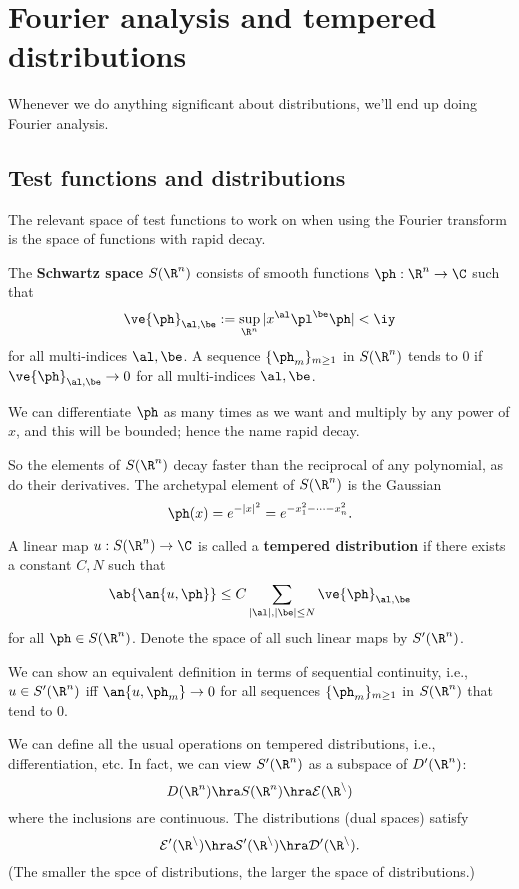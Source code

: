 \chapter{Fourier analysis and tempered distributions}
Whenever we do anything significant about distributions, we'll end up doing Fourier analysis. 
\section{Test functions and distributions}
The relevant space of test functions to work on when using the Fourier transform is the space of functions with rapid decay.
\begin{df}
The \textbf{Schwartz space} $S(\R^n)$ consists of smooth functions $\ph:\R^n\to \C$ such that 
\[
\ve{\ph}_{\al,\be}:=\sup_{\R^n}|x^{\al}\pl^{\be}\ph|<\iy
\]
for all multi-indices $\al,\be$. 
A sequence $\{\ph_m\}_{m\ge 1}$ in $S(\R^n)$ tends to 0 if $\ve{\ph}_{\al,\be}\to 0$ for all multi-indices $\al,\be$.
\end{df}
We can differentiate $\ph$ as many times as we want and multiply by any power of $x$, and this will be bounded; hence the name rapid decay.

So the elements of $S(\R^n)$ decay faster than the reciprocal of any polynomial, as do their derivatives. The archetypal element of $S(\R^n)$ is the Gaussian 
\[
\ph(x)=e^{-|x|^2}=e^{-x_1^2-\cdots -x_n^2}.
\]
\begin{df}
A linear map $u:S(\R^n)\to \C$ is called a \textbf{tempered distribution} if there exists a constant $C,N$ such that
\[
\ab{\an{u,\ph}}\le C\sum_{|\al|,|\be|\le N}\ve{\ph}_{\al,\be}
\]
for all $\ph\in S(\R^n)$. Denote the space of all such linear maps by $S'(\R^n)$. 
\end{df}
We can show an equivalent definition in terms of sequential continuity, i.e., $u\in S'(\R^n)$ iff $\an{u,\ph_m}\to 0$ for all sequences $\{\ph_m\}_{m\ge 1}$ in $S(\R^n)$ that tend to 0.

We can define all the usual operations on tempered distributions, i.e., differentiation, etc. In fact, we can view $S'(\R^n)$ as a subspace of $D'(\R^n)$: %
\[
D(\R^n)\hra S(\R^n)\hra \cal E(\R^n)
\]
where the inclusions are continuous. The distributions (dual spaces) satisfy
\[
\cal E'(\R^n) \hra \cal S'(\R^n)\hra D'(\R^n).
\]
(The smaller the spce of distributions, the larger the space of distributions.)
